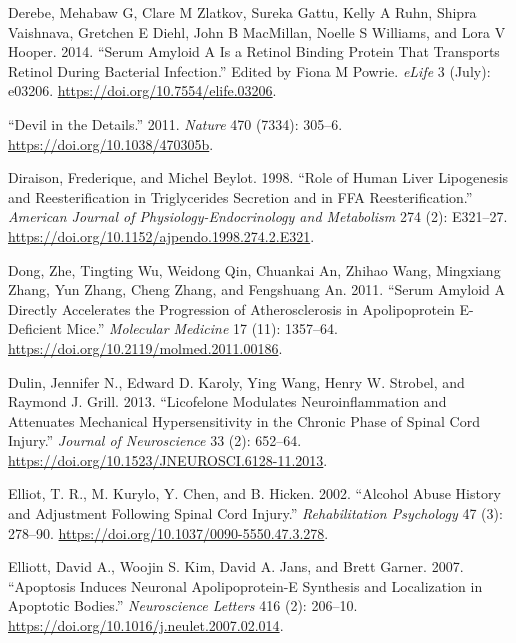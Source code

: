 \documentclass[9pt,lineno]{elife}
\newlength{\cslhangindent}
\newlength{\cslentryspacingunit} %
\newenvironment{CSLReferences}[2] %
 {%
  \setlength{\parindent}{0pt}
  \ifodd #1
  \let\oldpar\par
  \def\par{\hangindent=\cslhangindent\oldpar}
  \fi
  \setlength{\parskip}{#2\cslentryspacingunit}
 }%
 {}
\begin{document}
\begin{landscape}
\begin{landscape}
\begin{landscape}
\begin{landscape}
\begin{CSLReferences}{1}{0}
\leavevmode{}%
Derebe, Mehabaw G, Clare M Zlatkov, Sureka Gattu, Kelly A Ruhn, Shipra Vaishnava, Gretchen E Diehl, John B MacMillan, Noelle S Williams, and Lora V Hooper. 2014. {``Serum Amyloid {A} Is a Retinol Binding Protein That Transports Retinol During Bacterial Infection.''} Edited by Fiona M Powrie. \emph{eLife} 3 (July): e03206. \url{https://doi.org/10.7554/elife.03206}.

\leavevmode{}%
{``Devil in the Details.''} 2011. \emph{Nature} 470 (7334): 305--6. \url{https://doi.org/10.1038/470305b}.

\leavevmode{}%
Diraison, Frederique, and Michel Beylot. 1998. {``Role of Human Liver Lipogenesis and Reesterification in Triglycerides Secretion and in {FFA} Reesterification.''} \emph{American Journal of Physiology-Endocrinology and Metabolism} 274 (2): E321--27. \url{https://doi.org/10.1152/ajpendo.1998.274.2.E321}.

\leavevmode{}%
Dong, Zhe, Tingting Wu, Weidong Qin, Chuankai An, Zhihao Wang, Mingxiang Zhang, Yun Zhang, Cheng Zhang, and Fengshuang An. 2011. {``Serum {Amyloid A Directly Accelerates} the {Progression} of {Atherosclerosis} in {Apolipoprotein E-Deficient Mice}.''} \emph{Molecular Medicine} 17 (11): 1357--64. \url{https://doi.org/10.2119/molmed.2011.00186}.

\leavevmode{}%
Dulin, Jennifer N., Edward D. Karoly, Ying Wang, Henry W. Strobel, and Raymond J. Grill. 2013. {``Licofelone {Modulates Neuroinflammation} and {Attenuates Mechanical Hypersensitivity} in the {Chronic Phase} of {Spinal Cord Injury}.''} \emph{Journal of Neuroscience} 33 (2): 652--64. \url{https://doi.org/10.1523/JNEUROSCI.6128-11.2013}.

\leavevmode{}%
Elliot, T. R., M. Kurylo, Y. Chen, and B. Hicken. 2002. {``Alcohol Abuse History and Adjustment Following Spinal Cord Injury.''} \emph{Rehabilitation Psychology} 47 (3): 278--90. \url{https://doi.org/10.1037/0090-5550.47.3.278}.

\leavevmode{}%
Elliott, David A., Woojin S. Kim, David A. Jans, and Brett Garner. 2007. {``Apoptosis Induces Neuronal Apolipoprotein-{E} Synthesis and Localization in Apoptotic Bodies.''} \emph{Neuroscience Letters} 416 (2): 206--10. \url{https://doi.org/10.1016/j.neulet.2007.02.014}.


\end{CSLReferences}
\end{landscape}
\end{landscape}
\end{landscape}
\end{landscape}
\end{document}
